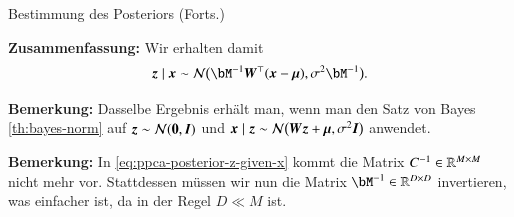 \begin{frame}{Bestimmung des Posteriors (Forts.)}{}
	\begin{boxGray}
		\textbf{Zusammenfassung:} Wir erhalten damit
		\begin{equation} \label{eq:ppca-posterior-z-given-x}
			\bz \mid \bx \sim \norm\bigl( \bM^{-1} \bW^\top (\bx - \bmu), \sigma^2 \bM^{-1} \bigr).
		\end{equation}
	\end{boxGray}
	
	\begin{boxGray}
		\textbf{Bemerkung:} Dasselbe Ergebnis erhält man, wenn man den Satz von Bayes \ref{th:bayes-norm}
		auf $\bm{z} \sim \mathcal{N}(\bm{0}, \bm{I})$ und $\bm{x} \mid \bm{z} \sim \mathcal{N}\bigl( \bm{W} \bm{z} + \bm{\mu}, \sigma^2 \bm{I} \bigr)$ anwendet.
	\end{boxGray}
	
	\begin{boxGray}
		\textbf{Bemerkung:} In \eqref{eq:ppca-posterior-z-given-x} kommt die Matrix $C^{-1} \in \mathbb{R}^{M \times M}$ nicht mehr vor.
		Stattdessen müssen wir nun die Matrix $\bM^{-1} \in \R^{D \times D}$ invertieren, was einfacher ist, da
		in der Regel $D \ll M$ ist.
	\end{boxGray}
\end{frame}

